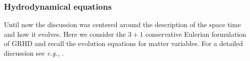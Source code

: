\subsubsection{Hydrodynamical equations}

Until now the discussion was centered around the description of the space time and how it 
evolves. Here we consider the $3+1$ conservative Eulerian formulation of \ac{GRHD} and recall the 
evolution equations for matter variables. 
For a detailed discussion see \textit{e.g.,} \citet{Misner:1973,Schutz:2009a,Gourgoulhon:2006bn,Andersson:2006nr,Rezzolla:2013}.
%
%
